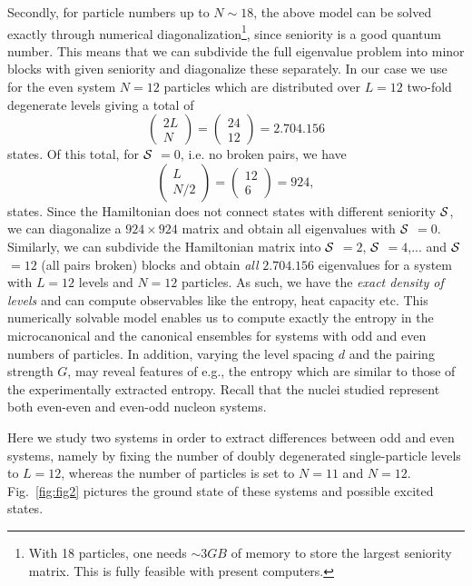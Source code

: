 Secondly, for particle numbers up to $N \sim 18$, the above model can be solved exactly through numerical diagonalization\footnote{With 18 particles, one needs $\sim 3 GB$ of memory to store the largest
seniority matrix. This is fully feasible with present computers.}, since seniority is a good quantum number. This means that we can subdivide the full eigenvalue problem into minor blocks with given seniority and diagonalize these separately. In our case we use for the even system $N=12$ particles which are distributed over $L=12$ two-fold degenerate levels giving a total of \begin{equation}
\left(\begin{array}{c}2L\\N\end{array}\right)=\left(\begin{array}{c}24\\12\end{array}\right)=2.704.156
\end{equation}
states. Of this total, for $\cal{S}$ $=0$, i.e. no broken pairs, we have 
\begin{equation}
\left(\begin{array}{c}L\\N/2\end{array}\right)=\left(\begin{array}{c}12\\6\end{array}\right)=924,
\end{equation} 
states. Since the Hamiltonian does not connect states with different seniority $\cal{S}$, we can diagonalize a $924\times 924$ matrix and obtain all eigenvalues with $\cal{S}$ $=0$. Similarly, we can subdivide the Hamiltonian matrix into $\cal{S}$ $=2$, $\cal{S}$ $=4$,... and $\cal{S}$ $=12$ (all pairs broken) blocks and obtain {\em all} $2.704.156$ eigenvalues for a system with $L=12$ levels and $N=12$ particles. As such, we have the {\em exact density of levels} and can compute observables like the entropy, heat capacity etc. This numerically solvable model enables us to compute exactly the entropy in the microcanonical and the canonical ensembles for systems with odd and even numbers of particles.  In addition, varying the level spacing $d$ and the pairing strength $G$, may reveal features of e.g., the entropy which are similar to those of the experimentally extracted entropy. Recall that the nuclei studied represent both even-even and even-odd nucleon systems.

Here we study two systems in order to extract differences between odd and even systems, namely by fixing the number of doubly degenerated single-particle levels to $L=12$, whereas the number of particles is set to $N=11$ and $N=12$.  Fig.\ \ref{fig:fig2} pictures the ground state of these systems and possible excited states.

